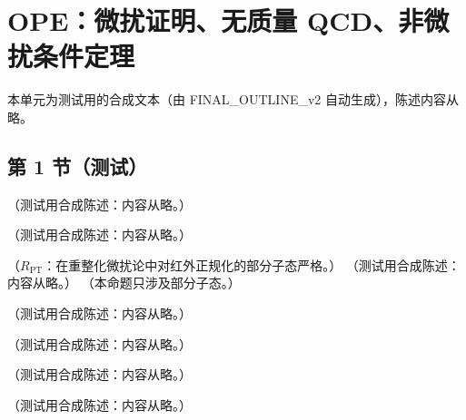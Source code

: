\chapter{OPE：微扰证明、无质量 QCD、非微扰条件定理}\label{app:appM}
本单元为测试用的合成文本（由 FINAL\_OUTLINE\_v2 自动生成），陈述内容从略。

\section{第 1 节（测试）}\label{sec:appM-overview}

\begin{definition}\label{def:appM-bphz}
（测试用合成陈述：内容从略。）
\end{definition}

\begin{lemma}[表观发散度的外线公式]\label{lem:appM-degree}
（测试用合成陈述：内容从略。）
\end{lemma}

\begin{theorem}\label{thm:appM-zimmermann}
（$R_{\mathrm{PT}}$：在重整化微扰论中对红外正规化的部分子态严格。）
（测试用合成陈述：内容从略。）
（本命题只涉及部分子态。）
\end{theorem}

\begin{example}[非顶点可加的超减除会失败]\label{ex:appM-nonadditive}
（测试用合成陈述：内容从略。）
\end{example}

\begin{theorem}\label{thm:appM-weinberg}
（测试用合成陈述：内容从略。）
\end{theorem}

\begin{corollary}[渐近指数与子图发散度]\label{cor:appM-weinberg-degree}
（测试用合成陈述：内容从略。）
\end{corollary}

\begin{remark}\label{rem:appM-forest-asymptotics}
（测试用合成陈述：内容从略。）
\end{remark}

